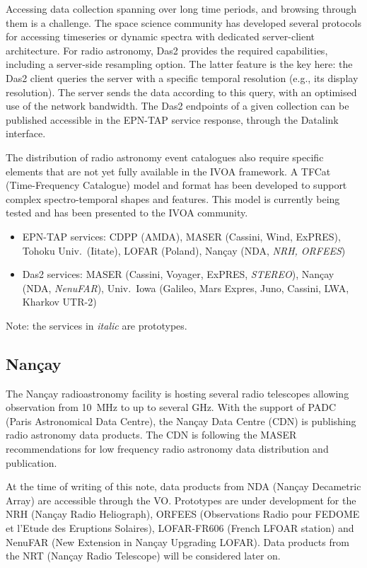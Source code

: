 \documentclass[11pt,a4paper]{ivoa}
\begin{document}
Accessing data collection spanning over long time periods, and browsing through them is a challenge. 
The space science community has developed several protocols for accessing timeseries or dynamic spectra 
with dedicated server-client architecture. For radio astronomy, Das2 \citep{10.1002/essoar.10500359.1} 
provides the required capabilities, including a server-side resampling option. The latter feature is 
the key here: the Das2 client queries the server with a specific temporal resolution (e.g., its display
resolution). The server sends the data according to this query, with an optimised use of the network
bandwidth. The Das2 endpoints of a given collection can be published accessible in the EPN-TAP service 
response, through the Datalink interface.

The distribution of radio astronomy event catalogues also require specific elements that are not yet
fully available in the IVOA framework. A TFCat (Time-Frequency Catalogue) model and format has been 
developed to support complex spectro-temporal shapes and features. This model is currently being 
tested and has been presented to the IVOA community. 

\begin{itemize}
\item EPN-TAP services: CDPP (AMDA), MASER (Cassini, Wind, ExPRES), Tohoku Univ.\ (Iitate), LOFAR 
(Poland), Nan\c cay (NDA, \emph{NRH, ORFEES})
\item Das2 services: MASER (Cassini, Voyager, ExPRES, \emph{STEREO}), Nan\c cay (NDA, \emph{NenuFAR}), 
Univ.\ Iowa (Galileo, Mars Expres, Juno, Cassini, LWA, Kharkov UTR-2)
\end{itemize}
Note: the services in \emph{italic} are prototypes.

\subsection{Nan\c cay}
\label{sec:Nancay}

The Nan\c cay radioastronomy facility is hosting several radio telescopes allowing observation from 
10~MHz to up to several GHz. With the support of PADC (Paris Astronomical Data Centre), the Nan\c cay 
Data Centre (CDN) is publishing radio astronomy data products. The CDN is following the MASER \cite{10.5334/dsj-2020-012}
recommendations for low frequency radio astronomy data distribution and publication. 

At the time of writing of this note, data products from NDA (Nan\c cay Decametric Array) are accessible 
through the VO. Prototypes are under development for the NRH (Nan\c cay Radio Heliograph), ORFEES 
(Observations Radio pour FEDOME et l'Etude des Eruptions Solaires), LOFAR-FR606 (French LFOAR station) 
and NenuFAR (New Extension in Nan\c cay Upgrading LOFAR). Data products from the NRT (Nan\c cay Radio 
Telescope) will be considered later on. 
\end{document}
